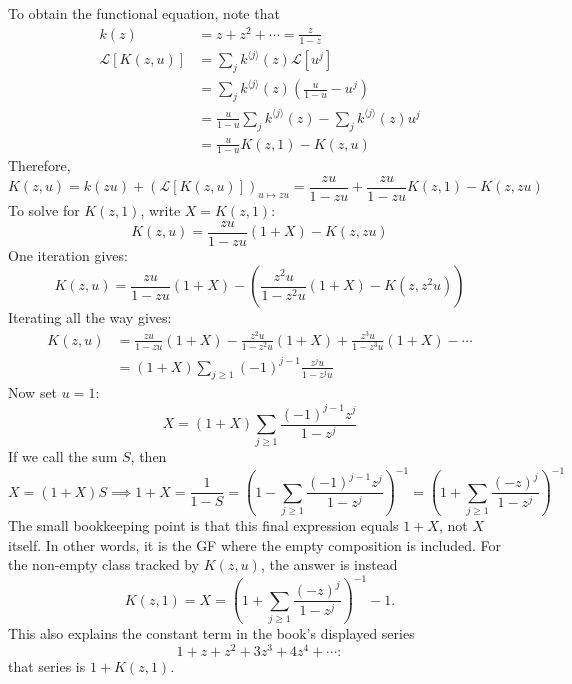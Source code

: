 
To obtain the functional equation, note that
\begin{equation*}
    \begin{aligned}
        k(z) &= z + z^{2} + \cdots = \frac{z}{1 - z} \\
        \mathcal{L}[K(z, u)]
            &= \sum_{j} k^{\langle j \rangle}(z)\mathcal{L}[u^{j}] \\
            &= \sum_{j} k^{\langle j \rangle}(z)\left(\frac{u}{1 - u} - u^{j}\right) \\
            &= \frac{u}{1 - u} \sum_{j} k^{\langle j \rangle}(z) - \sum_{j} k^{\langle j \rangle}(z)u^{j} \\
            &= \frac{u}{1 - u} K(z, 1) - K(z, u)
    \end{aligned}
\end{equation*}
Therefore,
\begin{equation*}
    K(z, u) = k(zu) + (\mathcal{L}[K(z, u)])_{u \mapsto zu} = \frac{zu}{1 - zu} + \frac{zu}{1 - zu} K(z, 1) - K(z, zu)
\end{equation*}
To solve for $K(z, 1)$, write $X = K(z, 1)$:
\begin{equation*}
    K(z, u) = \frac{zu}{1 - zu}(1 + X) - K(z, zu)
\end{equation*}
One iteration gives:
\begin{equation*}
    K(z, u) = \frac{zu}{1 - zu}(1 + X) - \left(\frac{z^{2}u}{1 - z^{2}u}(1 + X) - K(z, z^{2}u)\right)
\end{equation*}
Iterating all the way gives:
\begin{equation*}
    \begin{aligned}
        K(z, u)
        &= \frac{zu}{1 - zu}(1 + X) - \frac{z^{2}u}{1 - z^{2}u}(1 + X) + \frac{z^{3}u}{1 - z^{3}u}(1 + X) - \cdots \\
        &= (1 + X)\sum_{j \geq 1}(-1)^{j - 1} \frac{z^{j}u}{1 - z^{j}u}
    \end{aligned}
\end{equation*}
Now set $u = 1$:
\begin{equation*}
    X = (1 + X)\sum_{j \geq 1} \frac{(-1)^{j - 1}z^{j}}{1 - z^{j}}
\end{equation*}
If we call the sum $S$, then
\begin{equation*}
    X = (1 + X)S \implies 1 + X = \frac{1}{1 - S} = \left(1 - \sum_{j \geq 1} \frac{(-1)^{j - 1}z^{j}}{1 - z^{j}}\right)^{-1}
        = \left(1 + \sum_{j \geq 1} \frac{(-z)^{j}}{1 - z^{j}}\right)^{-1}
\end{equation*}
The small bookkeeping point is that this final expression equals $1 + X$, not $X$ itself.
In other words, it is the GF where the empty composition is included. For the non-empty class
tracked by $K(z,u)$, the answer is instead
\begin{equation*}
    K(z,1)=X
        = \left(1 + \sum_{j \geq 1} \frac{(-z)^j}{1-z^j}\right)^{-1} - 1.
\end{equation*}
This also explains the constant term in the book's displayed series
\[
    1 + z + z^2 + 3z^3 + 4z^4 + \cdots:
\]
that series is $1+K(z,1)$.

